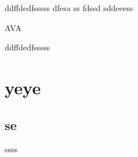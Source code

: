\documentclass{article}
\begin{document}
ddffdedfsssss
dfesa
ss
fdssd
sddeeess\par
{\Huge AVA}


ddffdedfsssss
\section{yeye}
\subsection{se}
ssss
\end{document}
